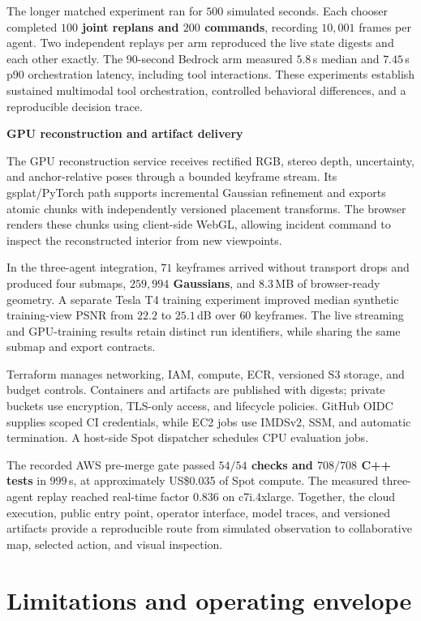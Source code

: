 \documentclass[10pt,a4paper]{article}
\newcommand{\code}[1]{\texttt{\small\detokenize{#1}}}
\newcommand{\indentedheading}[1]{\par\addvspace{0.65em}\noindent\hspace*{1em}\textbf{#1}\par\smallskip}
\begin{document}
The longer matched experiment ran for $500$ simulated
seconds. Each chooser completed \textbf{$100$ joint
replans and $200$ commands}, recording $10{,}001$
frames per agent. Two independent replays per arm
reproduced the live state digests and each other exactly.
The $90$-second Bedrock arm measured $5.8$\,s median
and $7.45$\,s p90 orchestration latency, including
tool interactions. These experiments establish sustained
multimodal tool orchestration, controlled behavioral
differences, and a reproducible decision trace.

\indentedheading{GPU reconstruction and artifact delivery}

The GPU reconstruction service receives rectified RGB,
stereo depth, uncertainty, and anchor-relative poses
through a bounded keyframe stream. Its gsplat/PyTorch
path supports incremental Gaussian refinement and
exports atomic \code{.splat} chunks with independently
versioned placement transforms. The browser renders
these chunks using client-side WebGL, allowing incident
command to inspect the reconstructed interior from
new viewpoints.

In the three-agent integration, $71$ keyframes arrived
without transport drops and produced four submaps,
\textbf{$259{,}994$ Gaussians}, and $8.3$\,MB of
browser-ready geometry. A separate Tesla T4 training
experiment improved median synthetic training-view
PSNR from $22.2$ to $25.1$\,dB over $60$ keyframes.
The live streaming and GPU-training results retain
distinct run identifiers, while sharing the same
submap and export contracts.

Terraform manages networking, IAM, compute, ECR,
versioned S3 storage, and budget controls. Containers
and artifacts are published with digests; private
buckets use encryption, TLS-only access, and lifecycle
policies. GitHub OIDC supplies scoped CI credentials,
while EC2 jobs use IMDSv2, SSM, and automatic termination.
A host-side Spot dispatcher schedules CPU evaluation jobs.

The recorded AWS pre-merge gate passed
\textbf{$54/54$ checks and $708/708$ C++ tests}
in $999$\,s, at approximately US\$0.035 of Spot
compute. The measured three-agent replay reached
real-time factor $0.836$ on c7i.4xlarge. Together,
the cloud execution, public entry point, operator
interface, model traces, and versioned artifacts
provide a reproducible route from simulated observation
to collaborative map, selected action, and visual
inspection.

\section{Limitations and operating envelope}
\end{document}
